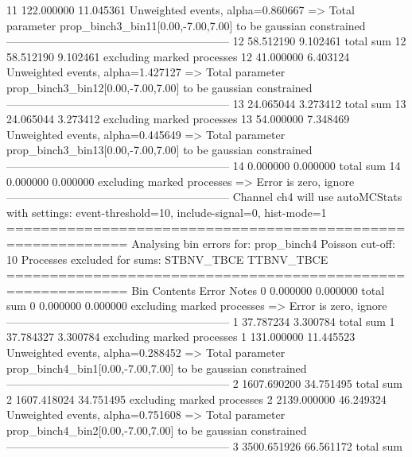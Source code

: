 11         122.000000      11.045361       Unweighted events, alpha=0.860667
  => Total parameter prop_binch3_bin11[0.00,-7.00,7.00] to be gaussian constrained
------------------------------------------------------------
12         58.512190       9.102461        total sum                     
12         58.512190       9.102461        excluding marked processes    
12         41.000000       6.403124        Unweighted events, alpha=1.427127
  => Total parameter prop_binch3_bin12[0.00,-7.00,7.00] to be gaussian constrained
------------------------------------------------------------
13         24.065044       3.273412        total sum                     
13         24.065044       3.273412        excluding marked processes    
13         54.000000       7.348469        Unweighted events, alpha=0.445649
  => Total parameter prop_binch3_bin13[0.00,-7.00,7.00] to be gaussian constrained
------------------------------------------------------------
14         0.000000        0.000000        total sum                     
14         0.000000        0.000000        excluding marked processes    
  => Error is zero, ignore      
------------------------------------------------------------
Channel ch4 will use autoMCStats with settings: event-threshold=10, include-signal=0, hist-mode=1
============================================================
Analysing bin errors for: prop_binch4
Poisson cut-off: 10
Processes excluded for sums: STBNV_TBCE TTBNV_TBCE
============================================================
Bin        Contents        Error           Notes                         
0          0.000000        0.000000        total sum                     
0          0.000000        0.000000        excluding marked processes    
  => Error is zero, ignore      
------------------------------------------------------------
1          37.787234       3.300784        total sum                     
1          37.784327       3.300784        excluding marked processes    
1          131.000000      11.445523       Unweighted events, alpha=0.288452
  => Total parameter prop_binch4_bin1[0.00,-7.00,7.00] to be gaussian constrained
------------------------------------------------------------
2          1607.690200     34.751495       total sum                     
2          1607.418024     34.751495       excluding marked processes    
2          2139.000000     46.249324       Unweighted events, alpha=0.751608
  => Total parameter prop_binch4_bin2[0.00,-7.00,7.00] to be gaussian constrained
------------------------------------------------------------
3          3500.651926     66.561172       total sum                     

